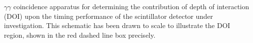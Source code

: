 \label{fig:doi-ctr} $\gamma\gamma$ coincidence apparatus for determining the contribution of depth of interaction (DOI) upon the timing performance of the scintillator detector under investigation. This schematic has been drawn to scale to illustrate the DOI region, shown in the red dashed line box precisely.
